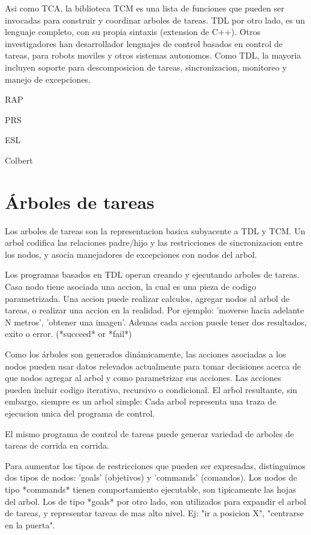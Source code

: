 \documentclass{article}
\begin{document}
Asi como TCA, la biblioteca TCM es una lista de funciones que pueden ser 
invocadas para construir y coordinar arboles de tareas.
TDL por otro lado, es un lenguaje completo, con su propia sintaxis 
(extension de C++).
Otros investigadores han desarrollador lenguajes de control basados en 
control de tareas, para robots moviles y otros sistemas autonomos.
Como TDL, la mayoria incluyen soporte para descomposicion de tareas, 
sincronizacion, monitoreo y manejo de excepciones.

\begin{enumeration}
\item RAP
\item PRS
\item ESL
\item Colbert
\end{enumeration}

\section{Árboles de tareas}

Los arboles de tareas son la representacion basica subyacente a TDL y TCM. 
Un arbol codifica las relaciones padre/hijo y
las restricciones de sincronizacion entre los nodos, y asocia manejadores 
de excepciones con nodos del arbol.

Los programas basados en TDL operan creando y ejecutando arboles de tareas. 
Casa nodo tiene asociada una accion, la cual es una pieza de codigo 
parametrizada.
Una accion puede realizar calculos, agregar nodos al arbol de tareas, o 
realizar una accion en la realidad. Por
ejemplo: 'moverse hacia adelante N metros', 'obtener una imagen'. 
Ademas cada accion puede tener dos resultados, exito o error.
(*succeed* or *fail*)

Como los árboles son generados dinámicamente, las acciones asociadas a los 
nodos pueden usar datos relevados actualmente
para tomar decisiones acerca de que nodos agregar al arbol y como 
parametrizar sus acciones.
Las acciones pueden incluir codigo iterativo, recursivo o condicional.
El arbol resultante, sin embargo, siempre es un arbol simple: Cada arbol 
representa una traza de ejecucion unica del programa de control.

El mismo programa de control de tareas puede generar variedad de arboles de 
tareas de corrida en corrida.

Para aumentar los tipos de restricciones que pueden ser expresadas, 
distinguimos dos tipos de nodos: 'goals' (objetivos) y 'commands' (comandos).
Los nodos de tipo *commands* tienen comportamiento ejecutable, son tipicamente
 las hojas del arbol.
Los de tipo *goals* por otro lado, son utilizados para expandir el arbol de 
tareas, y representar tareas de mas alto nivel. 
Ej: "ir a posicion X", "centrarse en la puerta".
\end{document}
